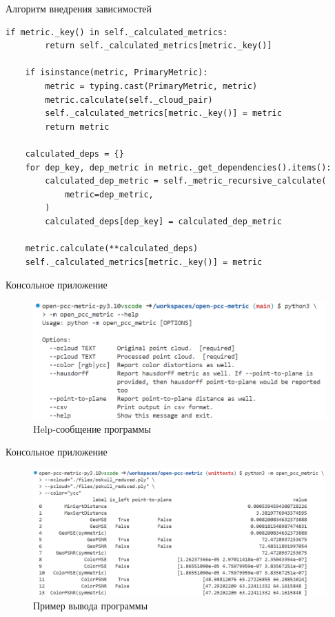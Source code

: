 \documentclass[aspectratio=169]{beamer}
\begin{document}
  \begin{frame}[fragile]{Алгоритм внедрения зависимостей}
    \begin{lstlisting}[caption={
      Алгоритм внедрения зависимостей.
    }, label={lst:calculator_recursive_calculate}, basicstyle=\tiny\ttfamily]
    if metric._key() in self._calculated_metrics:
        return self._calculated_metrics[metric._key()]

    if isinstance(metric, PrimaryMetric):
        metric = typing.cast(PrimaryMetric, metric)
        metric.calculate(self._cloud_pair)
        self._calculated_metrics[metric._key()] = metric
        return metric

    calculated_deps = {}
    for dep_key, dep_metric in metric._get_dependencies().items():
        calculated_dep_metric = self._metric_recursive_calculate(
            metric=dep_metric,
        )
        calculated_deps[dep_key] = calculated_dep_metric

    metric.calculate(**calculated_deps)
    self._calculated_metrics[metric._key()] = metric
    \end{lstlisting}
  \end{frame}

  \begin{frame}{Консольное приложение}
    \begin{figure}[H]
        \centering
        \includegraphics[width=0.7\linewidth]{assets/open_pcc_metric_help.png}
        \caption{Help-сообщение программы}
        \label{img:pcc_metric_help}
    \end{figure}
  \end{frame}

  \begin{frame}{Консольное приложение}
    \begin{figure}[H]
        \centering
        \includegraphics[width=0.7\linewidth]{assets/open_pcc_metric_output.png}
        \caption{Пример вывода программы}
        \label{img:pcc_metric_output}
    \end{figure}
  \end{frame}
\end{document}
